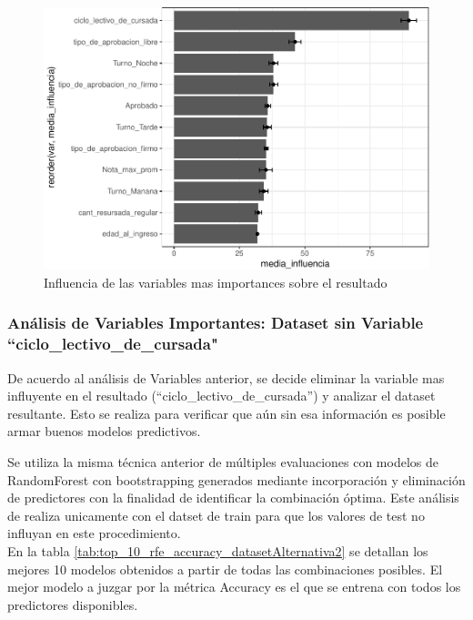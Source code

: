 \begin{figure}[!htb]
	\centering
	\includegraphics{imagenes/variables/influencia_de_variables-1.pdf}
	\caption{Influencia de las variables mas importances sobre el resultado}
	\label{fig:rfe_influencia_var}
\end{figure}

\clearpage



\subsubsection{\textbf{Análisis de Variables Importantes:} Dataset sin Variable ``ciclo\_lectivo\_de\_cursada"}\label{analisis-var_importantes-2}

De acuerdo al análisis de Variables anterior, se decide eliminar la variable mas influyente en el resultado (``ciclo\_lectivo\_de\_cursada'') y analizar el dataset resultante. Esto se realiza para verificar que aún sin esa información es posible armar buenos modelos predictivos.

Se utiliza la misma técnica anterior de múltiples evaluaciones con  modelos de RandomForest con bootstrapping generados mediante incorporación y eliminación de predictores con la finalidad de identificar la combinación óptima. Este análisis de realiza unicamente con el datset de train para que los valores de test no influyan en este procedimiento.\\

En la tabla \ref{tab:top_10_rfe_accuracy_datasetAlternativa2} se detallan los mejores 10 modelos obtenidos a partir de todas las combinaciones posibles. El mejor modelo a juzgar por la métrica Accuracy es el que se entrena con todos los predictores disponibles.

